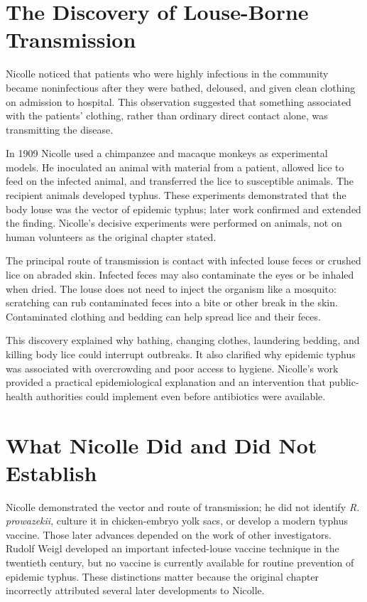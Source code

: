 \section{The Discovery of Louse-Borne Transmission}

Nicolle noticed that patients who were highly infectious in the community became noninfectious after they were bathed, deloused, and given clean clothing on admission to hospital. This observation suggested that something associated with the patients' clothing, rather than ordinary direct contact alone, was transmitting the disease.

In 1909 Nicolle used a chimpanzee and macaque monkeys as experimental models. He inoculated an animal with material from a patient, allowed lice to feed on the infected animal, and transferred the lice to susceptible animals. The recipient animals developed typhus. These experiments demonstrated that the body louse was the vector of epidemic typhus; later work confirmed and extended the finding. Nicolle's decisive experiments were performed on animals, not on human volunteers as the original chapter stated.

The principal route of transmission is contact with infected louse feces or crushed lice on abraded skin. Infected feces may also contaminate the eyes or be inhaled when dried. The louse does not need to inject the organism like a mosquito: scratching can rub contaminated feces into a bite or other break in the skin. Contaminated clothing and bedding can help spread lice and their feces.

This discovery explained why bathing, changing clothes, laundering bedding, and killing body lice could interrupt outbreaks. It also clarified why epidemic typhus was associated with overcrowding and poor access to hygiene. Nicolle's work provided a practical epidemiological explanation and an intervention that public-health authorities could implement even before antibiotics were available.

\section{What Nicolle Did and Did Not Establish}

Nicolle demonstrated the vector and route of transmission; he did not identify \emph{R. prowazekii}, culture it in chicken-embryo yolk sacs, or develop a modern typhus vaccine. Those later advances depended on the work of other investigators. Rudolf Weigl developed an important infected-louse vaccine technique in the twentieth century, but no vaccine is currently available for routine prevention of epidemic typhus. These distinctions matter because the original chapter incorrectly attributed several later developments to Nicolle.


